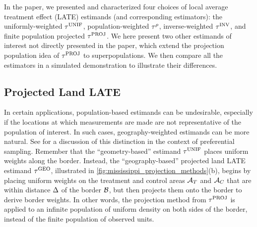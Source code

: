     In the paper, we presented and characterized four choices of local average treatment effect (LATE) estimands (and corresponding estimators): the uniformly-weighted \(\tau^{\mathrm{UNIF}}\), population-weighted \(\tau^{\rho}\), inverse-weighted \(\tau^{\mathrm{INV}}\), and finite population projected \(\tau^{\mathrm{PROJ}}\).
We here present two other estimands of interest not directly presented in the paper, which extend the projection population idea of \(\tau^{\mathrm{PROJ}}\) to superpopulations.
We then compare all the estimators in a simulated demonstration to illustrate their differences.

\subsection{Projected Land LATE}
In certain applications, population-based estimands can be undesirable, especially if the locations at which measurements are made are not representative of the population of interest.
In such cases, geography-weighted estimands can be more natural.
See \cite{antonelli2016positive} for a discussion of this distinction in the context of preferential sampling.
Remember that the ``geometry-based'' estimand \(\tau^{\mathrm{UNIF}}\) places uniform weights along the border.
Instead, the ``geography-based'' projected land LATE estimand \(\tau^{\mathrm{GEO}}\), illustrated in \autoref{fig:mississippi_projection_methods}(b), begins by placing uniform weights on the treatment and control areas \(\mathcal{A}_T\) and \(\mathcal{A}_C\) that are within distance \(\Delta\) of the border \(\mathcal{B}\), but then projects them onto the border to derive border weights.
In other words, the projection method from \(\tau^{\mathrm{PROJ}}\) is applied to an infinite population of uniform density on both sides of the border, instead of the finite population of observed units.

